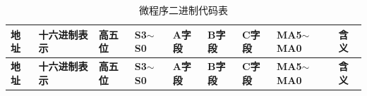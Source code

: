 \documentclass[UTF8,12pt,a4paper]{ctexart}
\begin{document}
{\small
\renewcommand{\arraystretch}{1.25}
\setlength{\tabcolsep}{2.2pt}

\begin{longtable}{|>{\centering\arraybackslash}m{0.95cm}
                  |>{\centering\arraybackslash}m{2.35cm}
                  |>{\centering\arraybackslash}m{1.25cm}
                  |>{\centering\arraybackslash}m{1.25cm}
                  |>{\centering\arraybackslash}m{1.15cm}
                  |>{\centering\arraybackslash}m{1.15cm}
                  |>{\centering\arraybackslash}m{1.15cm}
                  |>{\centering\arraybackslash}m{1.95cm}
                  |>{\centering\arraybackslash}m{3.0cm}|}
\caption{微程序二进制代码表}
\label{tab:micro-binary-code}\\
\hline
\textbf{地址} & \textbf{十六进制表示} & \textbf{高五位} & \textbf{S3$\sim$S0} & \textbf{A字段} & \textbf{B字段} & \textbf{C字段} & \textbf{MA5$\sim$MA0} & \textbf{含义} \\
\hline
\endfirsthead

\hline
\textbf{地址} & \textbf{十六进制表示} & \textbf{高五位} & \textbf{S3$\sim$S0} & \textbf{A字段} & \textbf{B字段} & \textbf{C字段} & \textbf{MA5$\sim$MA0} & \textbf{含义} \\
\hline
\endhead


\end{longtable}}
\end{document}
